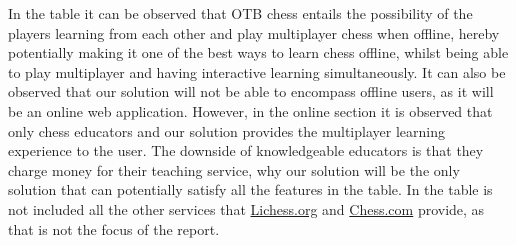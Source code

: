 In the table it can be observed that OTB chess entails the possibility of the players learning from each other and play
multiplayer chess when offline, hereby potentially making it one of the best ways to learn chess offline, whilst being
able to play multiplayer and having interactive learning simultaneously.
It can also be observed that our solution will not be able to encompass offline users, as it will be an online web
application.
However, in the online section it is observed that only chess educators and our solution provides the multiplayer
learning experience to the user.
The downside of knowledgeable educators is that they charge money for their teaching service, why our solution will be
the only solution that can potentially satisfy all the features in the table.
In the table is not included all the other services that \url{Lichess.org} and \url{Chess.com} provide, as that is not
the focus of the report.

